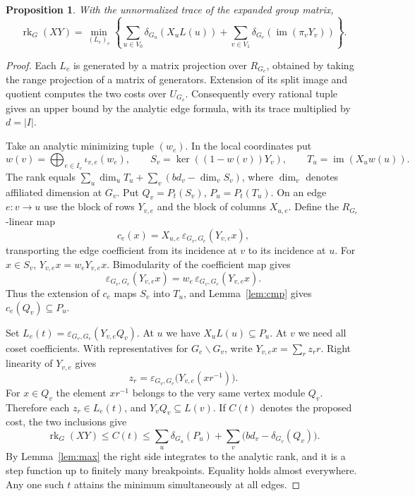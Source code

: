 \documentclass[11pt,a4paper,reqno]{amsart}
\numberwithin{equation}{section}
\newtheorem{proposition}[theorem]{Proposition}
\theoremstyle{remark}
\newcommand{\rk}{\operatorname{rk}}
\newcommand{\im}{\operatorname{im}}
\begin{document}
\begin{proposition}\label{prop:attain}
With the unnormalized trace of the expanded group matrix,
\[
 \rk_G(XY)=\min_{(L_e)_e}
 \left\{\sum_{u\in V_0}\delta_{G_u}(X_u L(u))
       +\sum_{v\in V_1}\delta_{G_v}(\im(\pi_vY_v))\right\}.
\]
\end{proposition}
\begin{proof}
Each \(L_e\) is generated by a matrix projection over \(R_{G_e}\), obtained by taking the range projection of a matrix of generators. Extension of its split image and quotient computes the two costs over \(U_{G_v}\). Consequently every rational tuple gives an upper bound by the analytic edge formula, with its trace multiplied by \(d=|I|\).

Take an analytic minimizing tuple \((w_e)\). In the local coordinates put
\[
 w(v)=\bigoplus_{e\in I_v}\iota_{v,e}(w_e),\qquad
 S_v=\ker((1-w(v))Y_v),\qquad T_u=\im(X_uw(u)).
\]
The rank equals \(\sum_u\dim_u T_u+\sum_v(bd_v-\dim_v S_v)\), where \(\dim_v\) denotes affiliated dimension at \(G_v\). Put \(Q_v=P_t(S_v)\), \(P_u=P_t(T_u)\). On an edge \(e:v\to u\) use the block of rows \(Y_{v,e}\) and the block of columns \(X_{u,e}\). Define the \(R_{G_e}\)-linear map
\[
             c_e(x)=X_{u,e}\,\varepsilon_{G_v,G_e}(Y_{v,e}x),
\]
transporting the edge coefficient from its incidence at \(v\) to its incidence at \(u\). For \(x\in S_v\), \(Y_{v,e}x=w_eY_{v,e}x\). Bimodularity of the coefficient map gives
\[
 \varepsilon_{G_v,G_e}(Y_{v,e}x)
   =w_e\,\varepsilon_{G_v,G_e}(Y_{v,e}x).
\]
Thus the extension of \(c_e\) maps \(S_v\) into \(T_u\), and Lemma~\ref{lem:cmp} gives \(c_e(Q_v)\subseteq P_u\).

Set \(L_e(t)=\varepsilon_{G_v,G_e}(Y_{v,e}Q_v)\). At \(u\) we have \(X_u L(u)\subseteq P_u\). At \(v\) we need all coset coefficients. With representatives for \(G_e\backslash G_v\), write \(Y_{v,e}x=\sum_r z_r r\). Right linearity of \(Y_{v,e}\) gives
\[
 z_r=\varepsilon_{G_v,G_e}\big(Y_{v,e}(xr^{-1})\big).
\]
For \(x\in Q_v\) the element \(xr^{-1}\) belongs to the very same vertex module \(Q_v\). Therefore each \(z_r\in L_e(t)\), and \(Y_vQ_v\subseteq L(v)\). If \(C(t)\) denotes the proposed cost, the two inclusions give
\[
 \rk_G(XY)\le C(t)\le
       \sum_u\delta_{G_u}(P_u)+\sum_v\big(bd_v-\delta_{G_v}(Q_v)\big).
\]
By Lemma~\ref{lem:max} the right side integrates to the analytic rank, and it is a step function up to finitely many breakpoints. Equality holds almost everywhere. Any one such \(t\) attains the minimum simultaneously at all edges.
\end{proof}
\end{document}
